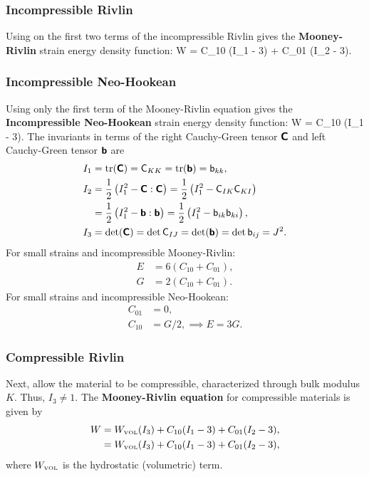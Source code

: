 \subsubsection{Incompressible Rivlin}
Using on the first two terms of the incompressible Rivlin gives 
the {\bf Mooney-Rivlin} strain energy density function:
\be
 W = C_{10} (I_1 - 3) + C_{01} (I_2 - 3).
\ee

\subsubsection{Incompressible Neo-Hookean}
Using only the first term of the Mooney-Rivlin equation gives the 
{\bf Incompressible Neo-Hookean} strain energy density function:
\be
 W = C_{10} (I_1 - 3).
\ee
The invariants in terms of the right Cauchy-Green tensor $\mbox{\sffamily\bfseries C}$ 
and left Cauchy-Green tensor $\mbox{\sffamily\bfseries b}$ are
\begin{align}
    I_1 & = \mbox{tr}(\mbox{\sffamily\bfseries C}) = \mathsf C_{KK} =
            \mbox{tr}(\mbox{\sffamily\bfseries b}) = \mathsf b_{kk}, \\
	I_2 & = \frac{1}{2} \left(I_1^2 - \mbox{\sffamily\bfseries C} : \mbox{\sffamily\bfseries C} \right) = 
	        \frac{1}{2} \left(I_1^2 - \mathsf C_{IK} \mathsf C_{KI} \right) \nonumber \\ 
	    & = \frac{1}{2} \left(I_1^2 - \mbox{\sffamily\bfseries b} : \mbox{\sffamily\bfseries b} \right) = 
	        \frac{1}{2} \left(I_1^2 - \mathsf b_{ik} \mathsf b_{ki} \right), \\
	I_3 & = \det(\mbox{\sffamily\bfseries C}) = \det \mathsf C_{IJ} = 
            \det(\mbox{\sffamily\bfseries b}) = \det \mathsf b_{ij} = J^2.
\end{align}
For small strains and incompressible Mooney-Rivlin:
\begin{align}
	E & = 6 \left(C_{10} + C_{01} \right), \\
	G & = 2 \left(C_{10} + C_{01} \right).
\end{align}
For small strains and incompressible Neo-Hookean:
\begin{align}
	C_{01} & = 0, \\
	C_{10} & = G/2, \implies E = 3 G. 
\end{align}

\subsubsection{Compressible Rivlin}
Next, allow the material to be compressible, characterized through 
bulk modulus $K$.  Thus, $I_3 \neq 1$.
The {\bf Mooney-Rivlin equation} for compressible materials is given by
\begin{align}
 W & = W_{\mbox{\tiny VOL}}(I_3) +  C_{10} (I_1 - 3) + C_{01} (I_2 - 3),  \\
   & = W_{\mbox{\tiny VOL}}(I_3) +  C_{10} (I_1 - 3) + C_{01} (I_2 - 3),  
\end{align}
where $W_{\mbox{\tiny VOL}}$ is the hydrostatic (volumetric) term.  

